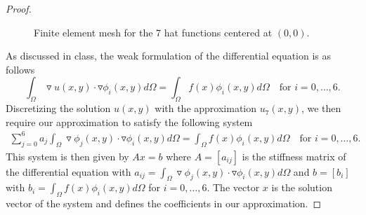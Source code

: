 \begin{proof}
\begin{figure}[!h]
\begin{center}
    \end{center}
    \caption{Finite element mesh for the 7 hat functions centered at $(0, 0)$.}\label{mesh}
  \end{figure}

  As discussed in class, the weak formulation of the differential equation
  \label{laplace} is as follows
  \[
    \int_\Omega \triangledown u(x, y) \cdot \triangledown\phi_i(x, y) d\Omega = \int_\Omega f(x)\phi_i(x, y)d\Omega \quad \text{for $i=0,\dots,6$}.
  \]
  Discretizing the solution $u(x, y)$ with the approximation $u_7(x, y)$, we
  then require our approximation to satisfy the following system
  \begin{align}\label{laplace_system}
    \sum_{j=0}^6 a_j \int_\Omega \triangledown \phi_j(x, y) \cdot \triangledown \phi_i(x, y) d\Omega = \int_\Omega f(x)\phi_i(x, y)d\Omega \quad \text{for $i=0,\dots,6$}.
  \end{align}
  This system is then given by $Ax = b$ where $A = [a_{ij}]$ is the stiffness matrix
  of the differential equation with $a_{ij} = \int_\Omega \triangledown \phi_j(x, y) \cdot \triangledown \phi_i(x, y) d\Omega$
  and $b = [b_i]$ with $b_i = \int_\Omega f(x)\phi_i(x, y)d\Omega$ for $i=0,\dots,6$. The vector $x$ is the solution vector of the system
  and defines the coefficients in our approximation.


\end{proof}
